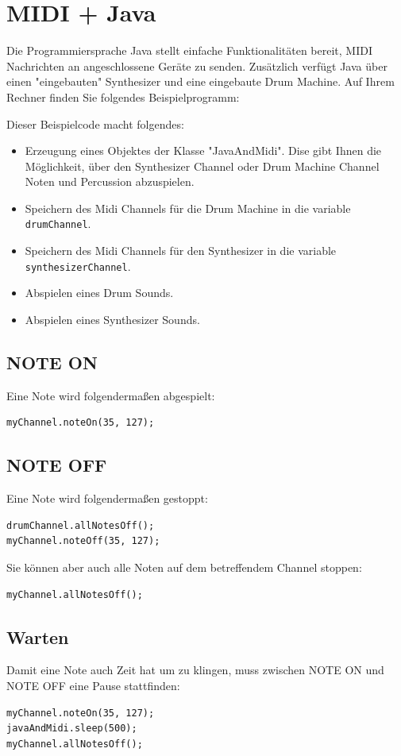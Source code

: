 \documentclass{article}
\begin{document}
	\section{MIDI + Java}
	Die Programmiersprache Java stellt einfache Funktionalitäten bereit, MIDI Nachrichten an angeschlossene Geräte zu senden.
	Zusätzlich verfügt Java über einen "eingebauten" Synthesizer und eine eingebaute Drum Machine.
	Auf Ihrem Rechner finden Sie folgendes Beispielprogramm:
	
	Dieser Beispielcode macht folgendes:
	\begin{itemize}
		\item Erzeugung eines Objektes der Klasse "JavaAndMidi".
		Dise gibt Ihnen die Möglichkeit, über den Synthesizer Channel oder Drum Machine Channel Noten und Percussion abzuspielen.
		\item Speichern des Midi Channels für die Drum Machine in die variable \verb|drumChannel|.
		\item Speichern des Midi Channels für den Synthesizer in die variable \verb|synthesizerChannel|.
		\item Abspielen eines Drum Sounds.
		\item Abspielen eines Synthesizer Sounds.
	\end{itemize}
	
	\subsection{NOTE ON}
	Eine Note wird folgendermaßen abgespielt:
\begin{lstlisting}
myChannel.noteOn(35, 127);	
\end{lstlisting}
	
	\subsection{NOTE OFF}
	Eine Note wird folgendermaßen gestoppt:
\begin{lstlisting}drumChannel.allNotesOff();
myChannel.noteOff(35, 127);	
\end{lstlisting}
	Sie können aber auch alle Noten auf dem betreffendem Channel stoppen:
\begin{lstlisting}
myChannel.allNotesOff();	
\end{lstlisting}

	\subsection{Warten}
	Damit eine Note auch Zeit hat um zu klingen, muss zwischen NOTE ON und NOTE OFF eine Pause stattfinden:
\begin{lstlisting}
myChannel.noteOn(35, 127);
javaAndMidi.sleep(500);
myChannel.allNotesOff();	
\end{lstlisting}
\end{document}
